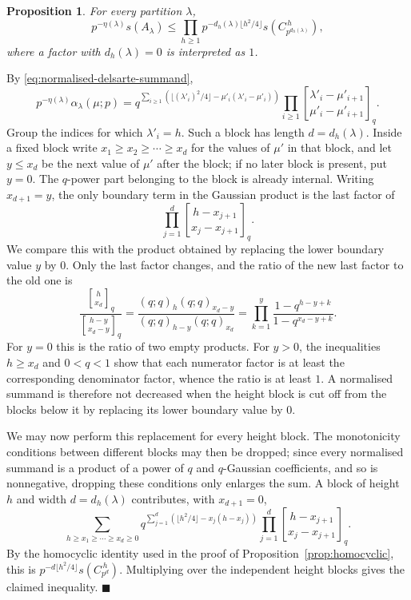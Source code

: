 \documentclass[a4paper,11pt,reqno]{amsart}
\theoremstyle{plain}
\newtheorem{proposition}[theorem]{Proposition}
\theoremstyle{remark}
\numberwithin{equation}{section}
\newcommand{\qgauss}[2]{\genfrac{[}{]}{0pt}{}{#1}{#2}_q}
\renewcommand{\leq}{\leqslant}
\renewcommand{\geq}{\geqslant}
\newenvironment{proofof}{{\bf Proof. }}{\hfill $\blacksquare$ \\}
\begin{document}
\begin{proposition}\label{prop:block-decoupling}
For every partition $\lambda$,
\[
        p^{-\eta(\lambda)}s(A_\lambda)
        \leq
        \prod_{h\geq 1}
        p^{-d_h(\lambda)\lfloor h^2/4\rfloor}
        s(C_{p^{d_h(\lambda)}}^{\,h}),
\]
where a factor with $d_h(\lambda)=0$ is interpreted as $1$.
\end{proposition}

\begin{proofof}
By \eqref{eq:normalised-delsarte-summand},
\[
        p^{-\eta(\lambda)}\alpha_\lambda(\mu;p)
        =
        q^{\sum_{i\geq 1}(\lfloor(\lambda'_i)^2/4\rfloor
        -\mu'_i(\lambda'_i-\mu'_i))}
        \prod_{i\geq 1}
        \qgauss{\lambda'_i-\mu'_{i+1}}{\mu'_i-\mu'_{i+1}}.
\]
Group the indices for which $\lambda'_i=h$. Such a block has length
$d=d_h(\lambda)$. Inside a fixed block write
$x_1\geq x_2\geq\cdots\geq x_d$ for the values of $\mu'$ in that block, and
let $y\leq x_d$ be the next value of $\mu'$ after the block; if no later block
is present, put $y=0$. The $q$-power part belonging to the block is already
internal. Writing $x_{d+1}=y$, the only boundary term in the Gaussian product is
the last factor of
\[
        \prod_{j=1}^{d}
        \qgauss{h-x_{j+1}}{x_j-x_{j+1}}.
\]
We compare this with the product obtained by replacing the lower boundary value
$y$ by $0$. Only the last factor changes, and the ratio of the new last factor
to the old one is
\[
        \frac{\qgauss{h}{x_d}}{\qgauss{h-y}{x_d-y}}
        =
        \frac{(q;q)_h(q;q)_{x_d-y}}{(q;q)_{h-y}(q;q)_{x_d}}
        =
        \prod_{k=1}^{y}
        \frac{1-q^{h-y+k}}{1-q^{x_d-y+k}}.
\]
For $y=0$ this is the ratio of two empty products. For $y>0$, the inequalities
$h\geq x_d$ and $0<q<1$ show that each numerator factor is at least the
corresponding denominator factor, whence the ratio is at least $1$. A
normalised summand is therefore not decreased when the height block is cut off from the
blocks below it by replacing its lower boundary value by $0$.

We may now perform this replacement for every height block. The monotonicity
conditions between different blocks may then be dropped; since every normalised
summand is a product of a power of $q$ and $q$-Gaussian coefficients, and so is
nonnegative, dropping these conditions only enlarges the sum. A block of height $h$ and width
$d=d_h(\lambda)$ contributes, with $x_{d+1}=0$,
\[
 \sum_{h\geq x_1\geq\cdots\geq x_d\geq 0}
 q^{\sum_{j=1}^{d}(\lfloor h^2/4\rfloor-x_j(h-x_j))}
 \prod_{j=1}^{d}
 \qgauss{h-x_{j+1}}{x_j-x_{j+1}}.
\]
By the homocyclic identity used in the proof of
Proposition~\ref{prop:homocyclic}, this is
$p^{-d\lfloor h^2/4\rfloor}s(C_{p^d}^{\,h})$. Multiplying over the independent
height blocks gives the claimed inequality.
\end{proofof}
\end{document}
